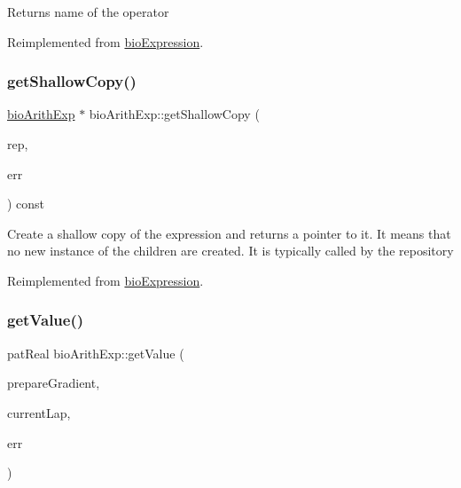 \begin{DoxyReturn}{Returns}
name of the operator 
\end{DoxyReturn}


Reimplemented from \hyperlink{classbio_expression_a2353a4afb3a2b0af7c63aba086a72bde}{bio\+Expression}.

\mbox{\label{classbio_arith_exp_a3d2f7448252ebfb7133a3eeef866bea4}} 
\subsubsection{\texorpdfstring{get\+Shallow\+Copy()}{getShallowCopy()}}
{\footnotesize\ttfamily \hyperlink{classbio_arith_exp}{bio\+Arith\+Exp} $\ast$ bio\+Arith\+Exp\+::get\+Shallow\+Copy (\begin{DoxyParamCaption}\item[{\hyperlink{classbio_expression_repository}{bio\+Expression\+Repository} $\ast$}]{rep,  }\item[{pat\+Error $\ast$\&}]{err }\end{DoxyParamCaption}) const\hspace{0.3cm}{\ttfamily [virtual]}}

Create a shallow copy of the expression and returns a pointer to it. It means that no new instance of the children are created. It is typically called by the repository 

Reimplemented from \hyperlink{classbio_expression_a442534762693b92baaf33928979a1bf8}{bio\+Expression}.

\mbox{\label{classbio_arith_exp_a291d459eb5a41df1ac6409420a8a5713}} 
\subsubsection{\texorpdfstring{get\+Value()}{getValue()}}
{\footnotesize\ttfamily pat\+Real bio\+Arith\+Exp\+::get\+Value (\begin{DoxyParamCaption}\item[{pat\+Boolean}]{prepare\+Gradient,  }\item[{pat\+U\+Long}]{current\+Lap,  }\item[{pat\+Error $\ast$\&}]{err }\end{DoxyParamCaption})\hspace{0.3cm}{\ttfamily [virtual]}}


